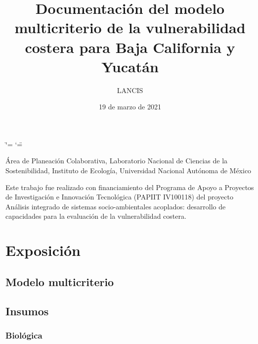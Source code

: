 \documentclass[letterpaper,10pt,spanish]{sphinxmanual}
\title{Documentación del modelo multicriterio de la vulnerabilidad costera para Baja California y Yucatán}
\date{19 de marzo de 2021}
\author{LANCIS}
\begin{document}
\ifdefined\shorthandoff
  \ifnum\catcode`\=\string=\active\shorthandoff{=}\fi
  \ifnum\catcode`\"=\active{}\fi
\fi

\pagestyle{empty}
\sphinxmaketitle
\pagestyle{plain}
\sphinxtableofcontents
\pagestyle{normal}
\label{\detokenize{index::doc}}


 Área de Planeación Colaborativa, Laboratorio Nacional de Ciencias de la Sostenibilidad, Instituto de Ecología, Universidad Nacional Autónoma de México

 Este trabajo fue realizado con financiamiento del Programa de Apoyo a Proyectos de Investigación e Innovación Tecnológica (PAPIIT IV100118)
del proyecto Análisis integrado de sistemas socio-ambientales acoplados: desarrollo de capacidades para la evaluación de la vulnerabilidad costera.


\chapter{Exposición}
\label{\detokenize{exposicion:exposicion}}\label{\detokenize{exposicion::doc}}

\section{Modelo multicriterio}
\label{\detokenize{exposicion:modelo-multicriterio}}


\section{Insumos}
\label{\detokenize{exposicion:insumos}}

\subsection{Biológica}
\label{\detokenize{exposicion:biologica}}
\end{document}
